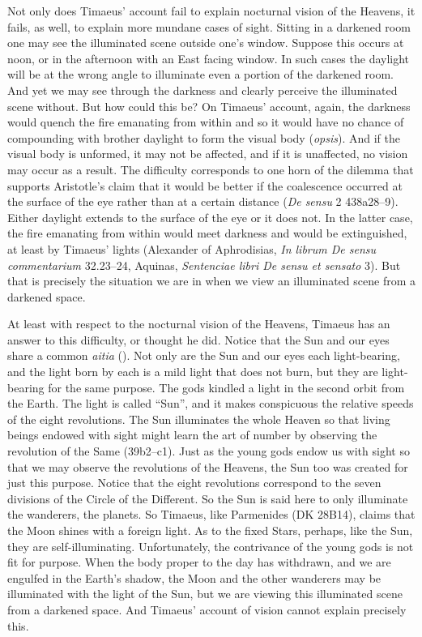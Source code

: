 Not only does Timaeus' account fail to explain nocturnal vision of the Heavens, it fails, as well, to explain more mundane cases of sight. Sitting in a darkened room one may see the illuminated scene outside one's window. Suppose this occurs at noon, or in the afternoon with an East facing window. In such cases the daylight will be at the wrong angle to illuminate even a portion of the darkened room. And yet we may see through the darkness and clearly perceive the illuminated scene without. But how could this be? On Timaeus' account, again, the darkness would quench the fire emanating from within and so it would have no chance of compounding with brother daylight to form the visual body (\emph{opsis}). And if the visual body is unformed, it may not be affected, and if it is unaffected, no vision may occur as a result. The difficulty corresponds to one horn of the dilemma that supports Aristotle's claim that it would be better if the coalescence occurred at the surface of the eye rather than at a certain distance (\emph{De sensu} 2 438a28--9). Either daylight extends to the surface of the eye or it does not. In the latter case, the fire emanating from within would meet darkness and would be extinguished, at least by Timaeus' lights (Alexander of Aphrodisias, \emph{In librum De sensu commentarium} 32.23--24, Aquinas, \emph{Sentenciae libri De sensu et sensato} 3). But that is precisely the situation we are in when we view an illuminated scene from a darkened space.

At least with respect to the nocturnal vision of the Heavens, Timaeus has an answer to this difficulty, or thought he did. Notice that the Sun and our eyes share a common \emph{aitia} (\citealt[112]{Johansen:2004dx}). Not only are the Sun and our eyes each light-bearing, and the light born by each is a mild light that does not burn, but they are light-bearing for the same purpose. The gods kindled a light in the second orbit from the Earth.  The light is called ``Sun'', and it makes conspicuous the relative speeds of the eight revolutions. The Sun illuminates the whole Heaven so that living beings endowed with sight might learn the art of number by observing the revolution of the Same (39b2--c1). Just as the young gods endow us with sight so that we may observe the revolutions of the Heavens, the Sun too was created for just this purpose. Notice that the eight revolutions correspond to the seven divisions of the Circle of the Different. So the Sun is said here to only illuminate the wanderers, the planets. So Timaeus, like Parmenides (DK 28B14), claims that the Moon shines with a foreign light. As to the fixed Stars, perhaps, like the Sun, they are self-illuminating. Unfortunately, the contrivance of the young gods is not fit for purpose. When the body proper to the day has withdrawn, and we are engulfed in the Earth's shadow, the Moon and the other wanderers may be illuminated with the light of the Sun, but we are viewing this illuminated scene from a darkened space. And Timaeus' account of vision cannot explain precisely this.

